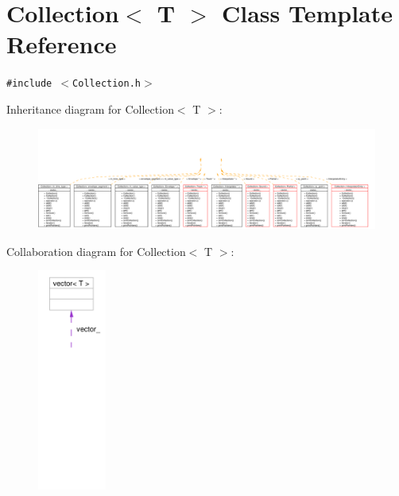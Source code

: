 \hypertarget{classCollection}{
\section{Collection$<$ T $>$ Class Template Reference}
\label{classCollection}
}
{\tt \#include $<$Collection.h$>$}

Inheritance diagram for Collection$<$ T $>$:\begin{figure}[H]
\begin{center}
\leavevmode
\includegraphics[width=420pt]{classCollection__inherit__graph}
\end{center}
\end{figure}
Collaboration diagram for Collection$<$ T $>$:\begin{figure}[H]
\begin{center}
\leavevmode
\includegraphics[width=64pt]{classCollection__coll__graph}
\end{center}
\end{figure}
